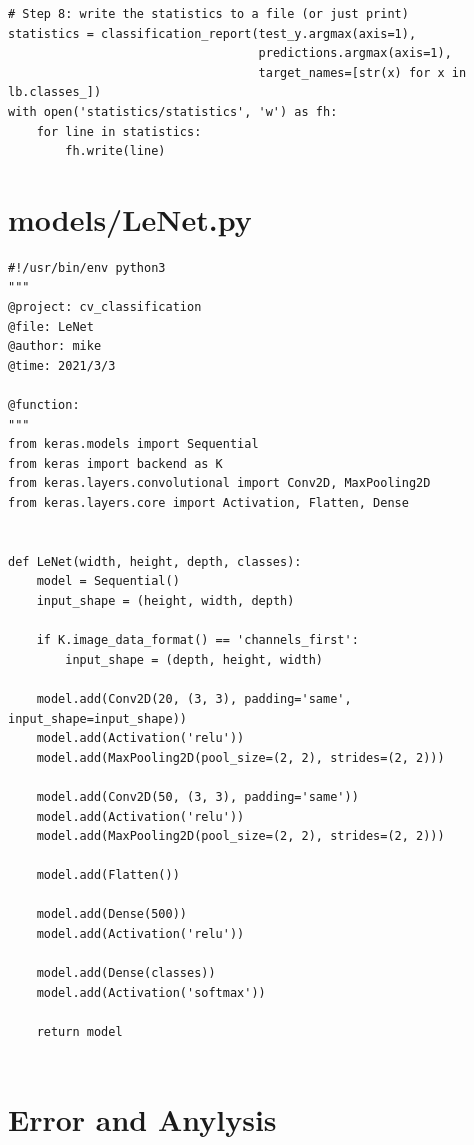 \begin{lstlisting}
# Step 8: write the statistics to a file (or just print)
statistics = classification_report(test_y.argmax(axis=1),
                                   predictions.argmax(axis=1),
                                   target_names=[str(x) for x in lb.classes_])
with open('statistics/statistics', 'w') as fh:
    for line in statistics:
        fh.write(line)  
\end{lstlisting}


\section{models/LeNet.py}

\begin{lstlisting}
#!/usr/bin/env python3
"""
@project: cv_classification
@file: LeNet
@author: mike
@time: 2021/3/3
 
@function:
"""
from keras.models import Sequential
from keras import backend as K
from keras.layers.convolutional import Conv2D, MaxPooling2D
from keras.layers.core import Activation, Flatten, Dense


def LeNet(width, height, depth, classes):
    model = Sequential()
    input_shape = (height, width, depth)

    if K.image_data_format() == 'channels_first':
        input_shape = (depth, height, width)

    model.add(Conv2D(20, (3, 3), padding='same', input_shape=input_shape))
    model.add(Activation('relu'))
    model.add(MaxPooling2D(pool_size=(2, 2), strides=(2, 2)))

    model.add(Conv2D(50, (3, 3), padding='same'))
    model.add(Activation('relu'))
    model.add(MaxPooling2D(pool_size=(2, 2), strides=(2, 2)))

    model.add(Flatten())

    model.add(Dense(500))
    model.add(Activation('relu'))

    model.add(Dense(classes))
    model.add(Activation('softmax'))

    return model
  
\end{lstlisting}


\section{Error and Anylysis}

